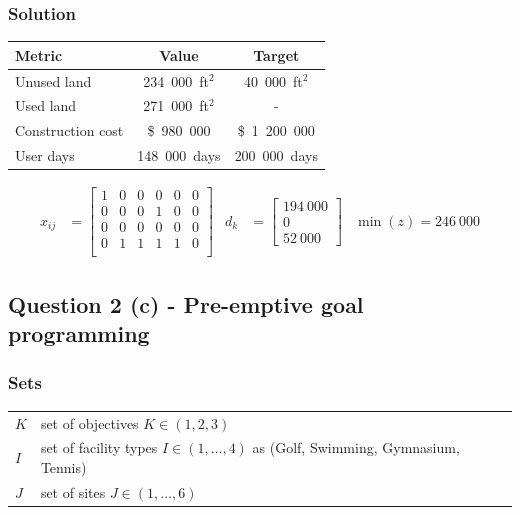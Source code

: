 \documentclass[a4paper,11pt]{article}
\begin{document}
\subsubsection{Solution}

\begin{center}
	\begin{tabular}{l c c}
		\hline
		\hline
		\textbf{Metric} & \textbf{Value} & \textbf{Target}\\
		\hline
		\hline
		Unused land & 234\ 000\ ft$^2$ & 40\ 000\ ft$^2$\\
		Used land & 271\ 000\ ft$^2$ & -\\
		Construction cost & \$\ 980\ 000 & \$\ 1\ 200\ 000 \\
		User days & 148\ 000\ days & 200\ 000\ days\\
		\hline
	\end{tabular}
\end{center}

\begin{align}
x_{ij} &= 
	\begin{bmatrix} 
    1  &  0  &  0  &  0  &  0  &  0 \\
    0  &  0  &  0  &  1  &  0  &  0 \\
    0  &  0  &  0  &  0  &  0  &  0 \\
    0  &  1  &  1  &  1  &  1  &  0 \\
	\end{bmatrix}
&d_k &= 	\begin{bmatrix} 
    194\ 000 \\
    0 \\
    52\ 000 \end{bmatrix} & \min(z) = 246\ 000
\end{align}

\newpage
\subsection{Question 2 (c) - Pre-emptive goal programming}

\subsubsection{Sets}
\begin{tabular}{lll}
	$K$ & set of objectives $K \in (1,2,3)$\\
	$I$ & set of facility types $I \in (1,\dots,4)$ as (Golf, Swimming, Gymnasium, Tennis)\\
$J$ & set of sites $J \in (1,\dots, 6)$ 
\end{tabular}
\end{document}

